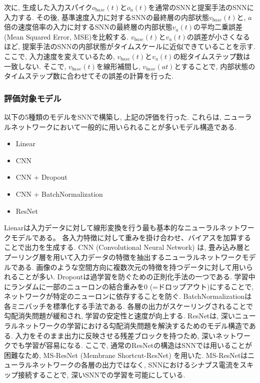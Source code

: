 次に, 生成した入力スパイク$o_{base}(t)$と$o_a(t)$を通常のSNNと提案手法のSNNに入力する.
その後, 基準速度入力に対するSNNの最終層の内部状態$v_{base}(t)$と, $a$倍の速度倍率の入力に対するSNNの最終層の内部状態$v_a(t)$の平均二乗誤差 (Mean Squared Error, MSE)を比較する.
$v_{base}(t)$と$v_a(t)$の誤差が小さくなるほど, 提案手法のSNNの内部状態がタイムスケールに近似できていることを示す.
ここで, 入力速度を変えているため, $v_{base}(t)$と$v_a(t)$の総タイムステップ数は一致しない.
そこで, $v_{base}(t)$を線形補間し, $v_{base}(at)$とすることで, 内部状態のタイムステップ数に合わせてその誤差の計算を行った.

\subsubsection{評価対象モデル}
以下の5種類のモデルをSNNで構築し, 上記の評価を行った.
これらは, ニューラルネットワークにおいて一般的に用いられることが多いモデル構造である.
\begin{itemize}
    \item Linear
    \item CNN\cite{cnn}
    \item CNN + Dropout\cite{dropout}
    \item CNN + BatchNormalization\cite{batchnorm}
    \item ResNet\cite{resnet}
\end{itemize}
Lienarは入力データに対して線形変換を行う最も基本的なニューラルネットワークモデルである。
各入力特徴に対して重みを掛け合わせ、バイアスを加算することで出力を生成する.
CNN (Convolutional Neural Network) は, 畳み込み層とプーリング層を用いて入力データの特徴を抽出するニューラルネットワークモデルである.
画像のような空間方向に複数次元の特徴を持つデータに対して用いられることが多い.
Dropoutは過学習を防ぐための正則化手法の一つである.
学習中にランダムに一部のニューロンの結合重みを0 (=ドロップアウト)にすることで, ネットワークが特定のニューロンに依存することを防ぐ.
BatchNormalizationは各ミニバッチを標準化する手法である.
各層の出力がスケーリングされることで勾配消失問題が緩和され, 学習の安定性と速度が向上する.
ResNetは, 深いニューラルネットワークの学習における勾配消失問題を解決するためのモデル構造である.
入力をそのまま出力に反映させる残差ブロックを持つため, 深いネットワークでも学習が容易になる.
ここで, 通常のResNetの構造はSNNでは用いることが困難なため, MS-ResNet (Membrane Shortcut-ResNet)\cite{msresnet} を用いた.
MS-ResNetはニューラルネットワークの各層の出力ではなく, SNNにおけるシナプス電流をスキップ接続することで, 深いSNNでの学習を可能にしている.

